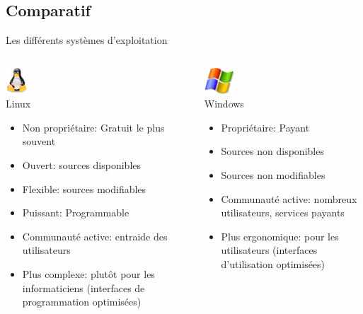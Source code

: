 \subsection{Comparatif}
\begin{frame}{Les différents systèmes d'exploitation}
  \begin{columns}
    \begin{column}{58mm}
      \begin{block}{\center \includegraphics[height=1cm]{img/s01/Tux.png}\\Linux}
        \begin{itemize}
        \item Non propriétaire: Gratuit le plus souvent
        \item Ouvert: sources disponibles
        \item Flexible: sources modifiables
        \item Puissant: Programmable
        \item Communauté active: entraide des utilisateurs
        \item Plus complexe: plutôt pour les informaticiens (interfaces
          de programmation optimisées)
        \end{itemize}
      \end{block}
    \end{column}
    \begin{column}{58mm}
      \begin{block}{\center \includegraphics[height=1cm]{img/s01/Windows_logo.png}\\Windows}
        \begin{itemize}
        \item Propriétaire: Payant
        \item Sources non disponibles
        \item Sources non modifiables
        \item Communauté active: nombreux utilisateurs, services payants
        \item Plus ergonomique: pour les utilisateurs (interfaces
          d'utilisation optimisées)

\end{itemize}
\end{block}
\end{column}
\end{columns}
\end{frame}
